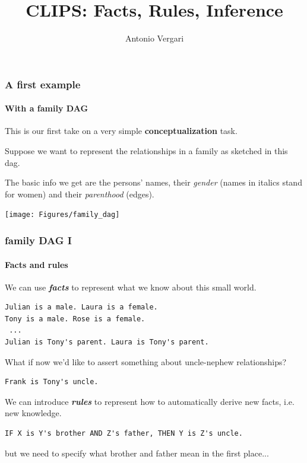 \documentclass[xcolor={usenames,dvipsnames,svgnames}, compress]{beamer}
\begin{document}
\title{CLIPS: Facts, Rules, Inference}
\author{Antonio Vergari}

\footnotesize \let\small\footnotesize

{
  \begin{frame}
    \titlepage
  \end{frame}
}



\begin{frame}
  \frametitle{A first example}
  \framesubtitle{With a family DAG}
  This is our first take on a very simple \textbf{conceptualization}
  task.\par
  Suppose we want to represent the relationships in a family as
  sketched in this dag.\par
  The basic info we get are the persons' names,
  their \emph{gender} (names in italics stand for women) and their \emph{parenthood}
  (edges).
  \begin{center}
    \texttt{[image: Figures/family\_dag]}
  \end{center}
  
  
\end{frame}

\begin{frame}
  \frametitle{family DAG I}
  \framesubtitle{Facts and rules}
  We can use \emph{\textbf{facts}} to represent what we know about this small
  world.
\begin{verbatim}
Julian is a male. Laura is a female.
Tony is a male. Rose is a female.
 ...
Julian is Tony's parent. Laura is Tony's parent.
\end{verbatim}
  What if now we'd like to assert something about uncle-nephew
  relationships?
\begin{verbatim}
Frank is Tony's uncle.
\end{verbatim}
  We can introduce \emph{\textbf{rules}} to represent how to automatically derive new
  facts, i.e. new knowledge.
  \begin{verbatim}
IF X is Y's brother AND Z's father, THEN Y is Z's uncle.
\end{verbatim}
  but we need to specify what brother and father mean in the first
  place... 
\end{frame}
\end{document}
